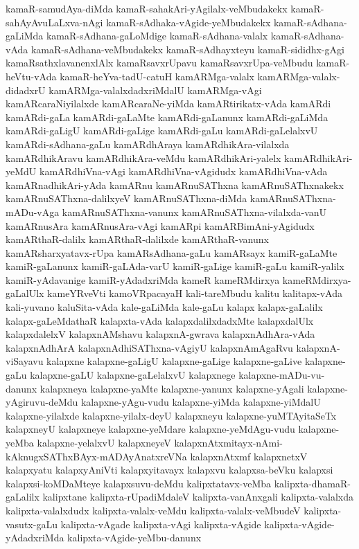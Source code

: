 {kamaR-samudAya-diMda
kamaR-sahakAri-yAgilalx-veMbudakekx
kamaR-sahAyAvuLaLxva-nAgi
kamaR-sAdhaka-vAgide-yeMbudakekx
kamaR-sAdhana-gaLiMda
kamaR-sAdhana-gaLoMdige
kamaR-sAdhana-valalx
kamaR-sAdhana-vAda
kamaR-sAdhana-veMbudakekx
kamaR-sAdhayxteyu
kamaR-sididhx-gAgi
kamaRsathxlavanenxlAlx
kamaRsavxrUpavu
kamaRsavxrUpa-veMbudu
kamaR-heVtu-vAda
kamaR-heYva-tadU-catuH
kamARMga-valalx
kamARMga-valalx-didadxrU
kamARMga-valalxdadxriMdalU
kamARMga-vAgi
kamARcaraNiyilalxde
kamARcaraNe-yiMda
kamARtirikatx-vAda
kamARdi
kamARdi-gaLa
kamARdi-gaLaMte
kamARdi-gaLanunx
kamARdi-gaLiMda
kamARdi-gaLigU
kamARdi-gaLige
kamARdi-gaLu
kamARdi-gaLelalxvU
kamARdi-sAdhana-gaLu
kamARdhAraya
kamARdhikAra-vilalxda
kamARdhikAravu
kamARdhikAra-veMdu
kamARdhikAri-yalelx
kamARdhikAri-yeMdU
kamARdhiVna-vAgi
kamARdhiVna-vAgidudx
kamARdhiVna-vAda
kamARnadhikAri-yAda
kamARnu
kamARnuSAThxna
kamARnuSAThxnakekx
kamARnuSAThxna-dalilxyeV
kamARnuSAThxna-diMda
kamARnuSAThxna-mADu-vAga
kamARnuSAThxna-vanunx
kamARnuSAThxna-vilalxda-vanU
kamARnusAra
kamARnusAra-vAgi
kamARpi
kamARBimAni-yAgidudx
kamARthaR-dalilx
kamARthaR-dalilxde
kamARthaR-vanunx
kamARsharxyatavx-rUpa
kamARsAdhana-gaLu
kamARsayx
kamiR-gaLaMte
kamiR-gaLanunx
kamiR-gaLAda-varU
kamiR-gaLige
kamiR-gaLu
kamiR-yalilx
kamiR-yAdavanige
kamiR-yAdadxriMda
kameR
kameRMdirxya
kameRMdirxya-gaLalUlx
kameYRveVti
kamoVRpacayaH
kali-tareMbudu
kalitu
kalitapx-vAda
kali-yuvano
kaluSita-vAda
kale-gaLiMda
kale-gaLu
kalapx
kalapx-gaLalilx
kalapx-gaLeMdathaR
kalapxta-vAda
kalapxdalilxdadxMte
kalapxdalUlx
kalapxdalelxV
kalapxnAMshavu
kalapxnA-gwrava
kalapxnAdhAra-vAda
kalapxnAdhArA
kalapxnAdhiSAThxna-vAgiyU
kalapxnAmAgaRvu
kalapxnA-viSayavu
kalapxne
kalapxne-gaLigU
kalapxne-gaLige
kalapxne-gaLive
kalapxne-gaLu
kalapxne-gaLU
kalapxne-gaLelalxvU
kalapxnege
kalapxne-mADu-vu-danunx
kalapxneya
kalapxne-yaMte
kalapxne-yanunx
kalapxne-yAgali
kalapxne-yAgiruvu-deMdu
kalapxne-yAgu-vudu
kalapxne-yiMda
kalapxne-yiMdalU
kalapxne-yilalxde
kalapxne-yilalx-deyU
kalapxneyu
kalapxne-yuMTAyitaSeTx
kalapxneyU
kalapxneye
kalapxne-yeMdare
kalapxne-yeMdAgu-vudu
kalapxne-yeMba
kalapxne-yelalxvU
kalapxneyeV
kalapxnAtxmitayx-nAmi-kAknugxSAThxBAyx-mADAyAnatxreVNa
kalapxnAtxmf
kalapxnetxV
kalapxyatu
kalapxyAniVti
kalapxyitavayx
kalapxvu
kalapxsa-beVku
kalapxsi
kalapxsi-koMDaMteye
kalapxsuvu-deMdu
kalipxtatavx-veMba
kalipxta-dhamaR-gaLalilx
kalipxtane
kalipxta-rUpadiMdaleV
kalipxta-vanAnxgali
kalipxta-valalxda
kalipxta-valalxdudx
kalipxta-valalx-veMdu
kalipxta-valalx-veMbudeV
kalipxta-vasutx-gaLu
kalipxta-vAgade
kalipxta-vAgi
kalipxta-vAgide
kalipxta-vAgide-yAdadxriMda
kalipxta-vAgide-yeMbu-danunx
}
